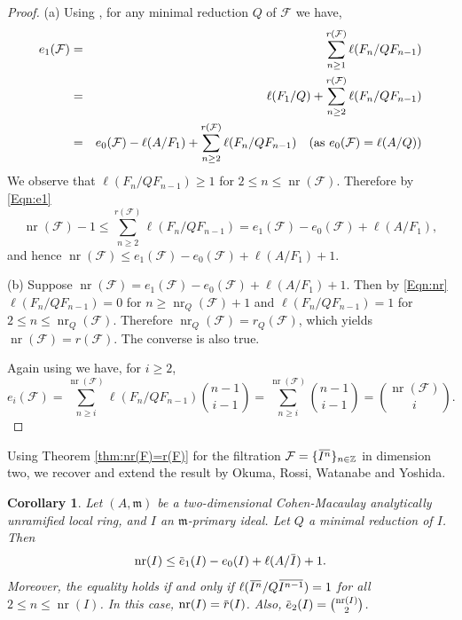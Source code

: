 \documentclass[12pt]{amsart}
\newtheorem{cor}[thm]{Corollary}
\theoremstyle{definition}
\theoremstyle{remark}
\numberwithin{equation}{section}
\newcommand{\m}{{\mathfrak m}}
\DeclareMathOperator{\nr}{{nr}}
\newcommand{\FF}{\mathcal{F}}
\newcommand{\ol}[1]{\mkern 1.5mu\overline{\mkern-1.5mu#1\mkern-1.5mu}\mkern 1.5mu} %
\begin{document}
\begin{proof}
(a) Using \cite[Proposition 4.6]{HucMar}, for any minimal reduction $Q$ of $\FF$ we have, 
\begin{eqnarray} \label{Eqn:e1}
e_1({\mathcal{F}}) & = &\sum_{n \geq 1}^{r(\mathcal{F})} \ell(F_n/QF_{n-1}) \nonumber\\
 & =& \ell(F_1/Q) + \sum_{n \geq 2}^{r(\mathcal{F})} \ell(F_n/QF_{n-1}) \nonumber \\
 & = &e_0(\FF) - \ell(A/F_1) + \sum_{n \geq 2}^{r(\mathcal{F})} \ell(F_n/QF_{n-1}) {\mbox{\quad (as $ e_0(\FF) = \ell(A/Q))$}}
\end{eqnarray}
We observe that $\ell(F_n/QF_{n-1}) \geq 1$ for $2 \leq n \leq \nr(\mathcal{F})$. 
Therefore by \eqref{Eqn:e1}
\begin{equation} \label{Eqn:nr}
\nr(\FF)-1 \leq \sum_{n \geq 2}^{r(\mathcal{F})} \ell(F_n/QF_{n-1})  
= e_1(\FF) -e_0(\FF) + \ell(A/F_1),
\end{equation}
and hence $\nr(\FF) \leq e_1(\FF) -e_0(\FF) + \ell(A/F_1) +1$. 

\par \vspace{2mm}
(b) Suppose $\nr(\FF) = e_1(\FF) -e_0(\FF) + \ell(A/F_1) +1$.
Then by \eqref{Eqn:nr} $\ell(F_n/QF_{n-1}) = 0$ for 
$n\geq \nr_Q(\FF)+1 $ and $\ell(F_n/QF_{n-1})=1$ 
for $2 \leq n \leq \nr_Q(\FF)$. 
Therefore $\nr_Q(\FF) = r_Q(\FF)$, 
which yields $\nr(\FF)=r(\FF)$. 
The converse is also true. 
\par \vspace{2mm}
Again using \cite[Proposition 4.6]{HucMar} we have, for $i \geq 2$, \[
e_i(\FF) = \sum_{n \geq i}^{\nr(\FF)} \ell(F_n/QF_{n-1}) \binom{n-1}{i-1} 
= \sum_{n \geq i}^{\nr(\FF)} \binom{n-1}{i-1} = \binom{\nr(\FF)}{i}.
\]
\end{proof}

\par 
Using Theorem \ref{thm:nr(F)=r(F)} for the filtration $\FF = \{\ol{I^n}\}_{n\in \mathbb{Z}}$ in dimension two, we recover and extend the result \cite[Theorem 2.7]{ORWY2022} by Okuma, Rossi, Watanabe and Yoshida.

\begin{cor}\cite[Theorem 2.7]{ORWY2022} 
Let $(A, \m)$ be a two-dimensional Cohen-Macaulay analytically unramified local ring, and $I$ an $\m$-primary ideal.
Let  $Q$ a minimal reduction of $I$.
Then
\[
{\nr}(I)\leq \ol{e}_1(I)-e_0(I)+\ell(A/\ol{I})+1.
\]
Moreover, the equality holds if and only if 
$\ell(\ol{I^n}/Q\ol{I^{n-1}}) = 1$ for all $2 \leq n \leq {\nr}(I)$. 
In this case, ${\nr}(I) = \ol{r}(I)$. 
Also, $\ol{e}_2(I) = \binom{{\nr}(I)}{ 2}$. 
\end{cor}
\end{document}
